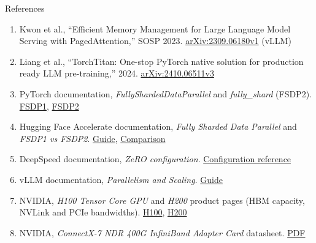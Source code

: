 \begin{frame}[allowframebreaks]{References}
\begin{enumerate}
    \item Kwon et al., ``Efficient Memory Management for Large Language Model Serving with PagedAttention,'' SOSP 2023. \href{https://arxiv.org/abs/2309.06180v1}{arXiv:2309.06180v1} (vLLM)
    \item Liang et al., ``TorchTitan: One-stop PyTorch native solution for production ready LLM pre-training,'' 2024. \href{https://arxiv.org/abs/2410.06511v3}{arXiv:2410.06511v3}
    \item PyTorch documentation, \textit{FullyShardedDataParallel} and \textit{fully\_shard} (FSDP2). \href{https://docs.pytorch.org/docs/stable/fsdp.html}{FSDP1}, \href{https://docs.pytorch.org/docs/stable/distributed.fsdp.fully_shard.html}{FSDP2}
    \item Hugging Face Accelerate documentation, \textit{Fully Sharded Data Parallel} and \textit{FSDP1 vs FSDP2}. \href{https://huggingface.co/docs/accelerate/en/usage_guides/fsdp}{Guide}, \href{https://huggingface.co/docs/accelerate/en/concept_guides/fsdp1_vs_fsdp2}{Comparison}
    \item DeepSpeed documentation, \textit{ZeRO configuration}. \href{https://www.deepspeed.ai/docs/config-json/}{Configuration reference}
    \item vLLM documentation, \textit{Parallelism and Scaling}. \href{https://docs.vllm.ai/en/stable/serving/parallelism_scaling/}{Guide}
    \item NVIDIA, \textit{H100 Tensor Core GPU} and \textit{H200} product pages (HBM capacity, NVLink and PCIe bandwidths). \href{https://www.nvidia.com/en-us/data-center/h100/}{H100}, \href{https://www.nvidia.com/en-us/data-center/h200/}{H200}
    \item NVIDIA, \textit{ConnectX-7 NDR 400G InfiniBand Adapter Card} datasheet. \href{https://www.nvidia.com/content/dam/en-zz/Solutions/networking/infiniband-adapters/infiniband-connectx7-data-sheet.pdf}{PDF}
  \end{enumerate}
\end{frame}

